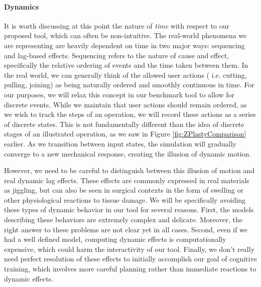\paragraph{Dynamics}

It is worth discussing at this point the nature of \textit{time} with respect
to our proposed tool, which can often be non-intuitive. The real-world
phenomena we are representing are heavily dependent on time in two
major ways: sequencing and lag-based effects. Sequencing refers to the
nature of cause and effect, specifically the relative ordering of
events and the time taken between them. In the real world, we can
generally think of the allowed user actions ( i.e. cutting, pulling,
joining) as being naturally ordered and smoothly continuous in
time. For our purposes, we will relax this concept in our benchmark
tool to allow for discrete events. While we maintain that user actions
should remain ordered, as we wish to track the steps of an operation,
we will record these actions as a series of discrete states. This is
not fundamentally different than the idea of discrete stages of an
illustrated operation, as we saw in Figure \ref{fig:ZPlastyComparison}
earlier. As we transition between input states, the simulation will
gradually converge to a new mechanical response, creating the illusion
of dynamic motion.

However, we need to be careful to distinguish between this illusion of
motion and real dynamic lag effects. These effects are commonly
expressed in real materials as jiggling, but can also be seen in
surgical contexts in the form of swelling or other physiological
reactions to tissue damage. We will be specifically avoiding these
types of dynamic behavior in our tool for several reasons. First, the
models describing these behaviors are extremely complex and
delicate. Moreover, the right answer to these problems are not clear
yet in all cases. Second, even if we had a well defined model,
computing dynamic effects is computationally expensive, which could
harm the interactivity of our tool. Finally, we don't really need
perfect resolution of these effects to initially accomplish our goal of
cognitive training, which involves more careful planning rather than
immediate reactions to dynamic effects. 




